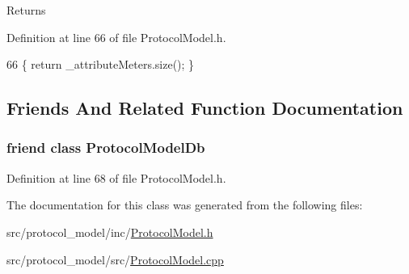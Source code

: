 \begin{DoxyReturn}{Returns}

\end{DoxyReturn}


Definition at line 66 of file Protocol\-Model.\-h.


\begin{DoxyCode}
66 \{ \textcolor{keywordflow}{return} \_attributeMeters.size(); \}
\end{DoxyCode}


\subsection{Friends And Related Function Documentation}
\hypertarget{class_vsid_1_1_protocol_model_a3c0d389e7a9476b06313d8fb9ca9fe68}{
\subsubsection[{Protocol\-Model\-Db}]{\setlength{\rightskip}{0pt plus 5cm}friend class {\bf Protocol\-Model\-Db}\hspace{0.3cm}{\ttfamily [friend]}}}\label{class_vsid_1_1_protocol_model_a3c0d389e7a9476b06313d8fb9ca9fe68}


Definition at line 68 of file Protocol\-Model.\-h.



The documentation for this class was generated from the following files\-:\begin{DoxyCompactItemize}
\item 
src/protocol\-\_\-model/inc/\hyperlink{_protocol_model_8h}{Protocol\-Model.\-h}\item 
src/protocol\-\_\-model/src/\hyperlink{_protocol_model_8cpp}{Protocol\-Model.\-cpp}\end{DoxyCompactItemize}
